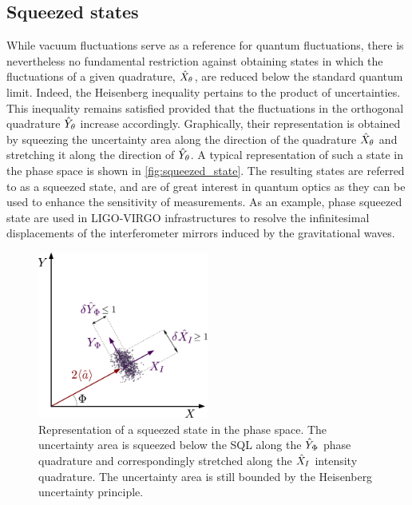 \subsection{Squeezed states}
While vacuum fluctuations serve as a reference for quantum fluctuations, there is nevertheless no fundamental restriction against obtaining states in which the fluctuations of a given quadrature, $\hat{X}_{\theta}$, are reduced below the standard quantum limit. Indeed, the Heisenberg inequality pertains to the product of uncertainties.
 This inequality remains satisfied provided that the fluctuations in the orthogonal quadrature $\hat{Y}_{\theta}$ increase accordingly. Graphically, their representation is obtained by squeezing the uncertainty area along the direction of the quadrature $\hat{X}_{\theta}$ and stretching it along the direction of $\hat{Y}_{\theta}$. A typical representation of such a state in the phase space is shown in \autoref{fig:squeezed_state}. The resulting states are referred to as a squeezed state, and are of great interest 
 in quantum optics as they can be used to enhance the sensitivity of measurements. As an example, phase squeezed state are used in LIGO-VIRGO infrastructures to resolve the infinitesimal displacements of the interferometer mirrors induced by the gravitational waves.

\begin{figure}
    \centering
    \includegraphics[width=0.5\textwidth]{chap_correlation/fig/fresnel_squeezed.pdf}
    \caption{Representation of a squeezed state in the phase space. The uncertainty area is squeezed below the SQL along the $\hat{Y}_{\Phi}$ phase quadrature and correspondingly stretched along the $\hat{X}_{I}$ intensity quadrature. The uncertainty area is still bounded by the Heisenberg uncertainty principle.}
    \label{fig:squeezed_state}
\end{figure}




